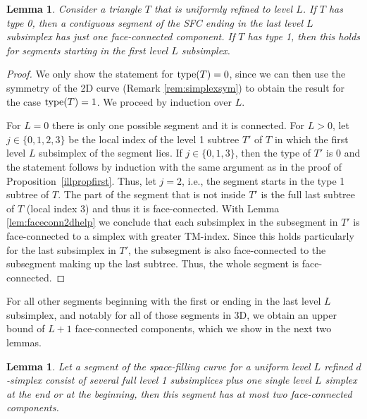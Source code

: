\documentclass[a4paper,11pt]{article}
\newtheorem{lem}[thm]{Lemma}
\begin{document}
\begin{lem}
  \label{lem:faceconn2d}
 Consider a triangle $T$ that is uniformly refined to level $L$.
 If $T$ has type 0, then a contiguous segment of the SFC ending in the last
 level $L$ subsimplex has just one face-connected component.
 If $T$ has type 1, then this holds for segments starting in the first level
 $L$ subsimplex.
\end{lem}
\begin{proof}
  We only show the statement for $\operatorname{type} (T)=0$, since we can then use
  the symmetry of the 2D curve (Remark \ref{rem:simplexsym}) to obtain
  the result for the case $\operatorname{type} (T)=1$.
  We proceed by induction over $L$.

  For $L=0$ there is only one possible segment and it is connected.
  For $L>0$, let $j\in\{0,1,2,3\}$ be the local index of the level
  1 subtree $T'$ of $T$ in which the first level $L$ subsimplex of the segment lies.
  If $j\in\{0,1,3\}$, then the type of $T'$ is 0 and the statement follows
  by induction with the same argument as in the proof of
  Proposition~\ref{illpropfirst}.
  Thus, let $j=2$, i.e., the segment starts in the type 1 subtree of $T$.
  The part of the segment that is not inside $T'$ is the full last subtree of
  $T$ (local index 3) and thus it is face-connected.
  With Lemma \ref{lem:faceconn2dhelp} we conclude that each subsimplex in the
  subsegment in $T'$ is face-connected to a simplex with greater TM-index.
  Since this holds particularly for the last subsimplex in $T'$, the subsegment
  is also face-connected to the subsegment making up the last subtree.
  Thus, the whole segment is face-connected.
\end{proof}

For all other segments beginning with the first or ending in the last level $L$
subsimplex, and notably for all of those segments in 3D, we obtain an upper
bound of $L+1$ face-connected components, which we show in the next two lemmas.



\begin{lem}
\label{lem:faceconnlem0}
 Let a segment of the space-filling curve for a uniform level $L$ refined $d$-simplex
 consist of several full level 1 subsimplices plus
 one single
 level $L$ simplex at the end or at the beginning, then this segment has at
 most two face-connected components.
\end{lem}
\end{document}

